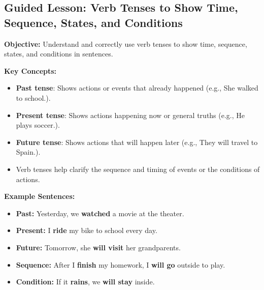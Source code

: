 \documentclass[12pt]{article}
\title{}
\date{}
\begin{document}
\subsection*{Guided Lesson: Verb Tenses to Show Time, Sequence, States, and Conditions}
\onehalfspacing

\begin{tcolorbox}[colframe=black!40, colback=gray!5, 
coltitle=black, colbacktitle=black!20, fonttitle=\bfseries\Large, 
title=Learning Objective, halign title=center, left=5pt, right=5pt, top=5pt, bottom=15pt]
\textbf{Objective:} Understand and correctly use verb tenses to show time, sequence, states, and conditions in sentences.
\end{tcolorbox}

\vspace{1em}

\begin{tcolorbox}[colframe=black!60, colback=white, 
coltitle=black, colbacktitle=black!15, fonttitle=\bfseries\Large, 
title=Key Concepts and Vocabulary, halign title=center, left=10pt, right=10pt, top=10pt, bottom=15pt]
\textbf{Key Concepts:}
\begin{itemize}
    \item \textbf{Past tense}: Shows actions or events that already happened (e.g., She walked to school.).
    \item \textbf{Present tense}: Shows actions happening now or general truths (e.g., He plays soccer.).
    \item \textbf{Future tense}: Shows actions that will happen later (e.g., They will travel to Spain.).
    \item Verb tenses help clarify the sequence and timing of events or the conditions of actions.
\end{itemize}
\end{tcolorbox}

\vspace{1em}

\begin{tcolorbox}[colframe=black!60, colback=white, 
coltitle=black, colbacktitle=black!15, fonttitle=\bfseries\Large, 
title=Examples, halign title=center, left=10pt, right=10pt, top=10pt, bottom=15pt]

\textbf{Example Sentences:}
\begin{itemize}
    \item \textbf{Past:} Yesterday, we \textbf{watched} a movie at the theater.
    \item \textbf{Present:} I \textbf{ride} my bike to school every day.
    \item \textbf{Future:} Tomorrow, she \textbf{will visit} her grandparents.
    \item \textbf{Sequence:} After I \textbf{finish} my homework, I \textbf{will go} outside to play.
    \item \textbf{Condition:} If it \textbf{rains}, we \textbf{will stay} inside.
\end{itemize}
\end{tcolorbox}
\end{document}
